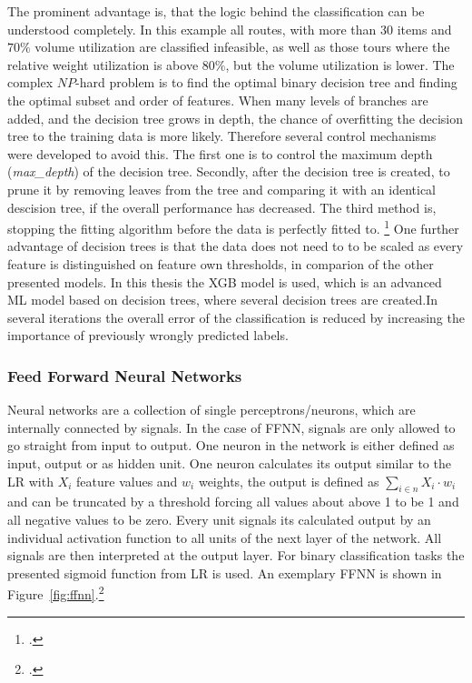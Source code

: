 
The  prominent advantage is, that the logic behind the classification can be understood
completely. In this example all routes, with more than 30 items and $70\%$ volume utilization are classified infeasible,
as well as those tours where the relative weight utilization is above $80\%$, but the volume utilization is lower. The complex
$NP$-hard problem is to find the optimal binary decision tree and finding the optimal subset and order of
features.
When many levels of branches are added, and the decision tree grows in depth, the chance of
overfitting the decision tree to the training data is more likely. Therefore several control mechanisms
were developed to avoid this. The first one is to control the maximum depth (\textit{max\_depth})
of the decision tree. Secondly, after the decision tree is created, to prune it by removing leaves from
the tree and comparing it with an identical descision tree, if the overall performance has decreased.
The third method is, stopping the fitting algorithm before the data is perfectly fitted to. \footcite[cf.][p.252]{kotsiantis_supervised_2007}
One further advantage of decision trees is that the data does not need to to be scaled as every feature is
distinguished on feature own thresholds, in comparion of the other presented models. In this thesis the \gls{XGB} model is used,
which is an advanced \gls{ML} model based on decision trees, where several decision trees are created.In several iterations
the overall error of the classification is reduced by increasing the importance of previously wrongly predicted labels.

\subsubsection{Feed Forward Neural Networks}

Neural networks are a collection of single perceptrons/neurons, which are internally connected by
signals. In the case of \gls{FFNN}, signals are only allowed to go straight from input to output. One neuron
in the network is either defined as input, output or as hidden unit. One neuron calculates its
output similar to the \gls{LR} with $X_i$ feature values and $w_i$ weights, the output is defined
as $\sum_{i \in n} X_i \cdot w_i$ and can be truncated by a threshold forcing all values about above 1
to be 1 and all negative values to be zero. Every unit signals its calculated output by an individual
activation function to all units of the next layer of the network. All signals are
then interpreted at the output layer. For binary classification tasks the presented sigmoid function from \gls{LR} is used.
An exemplary \gls{FFNN} is shown in Figure~\ref{fig:ffnn}.\footcite[cf.][p.255]{kotsiantis_supervised_2007}

